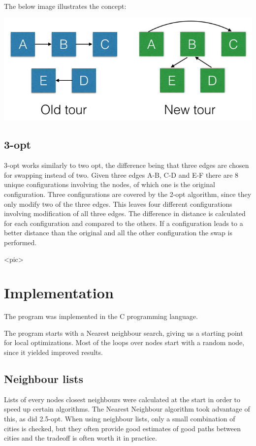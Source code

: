 \documentclass[paper=a4, fontsize=11pt,numbers=endperiod]{scrartcl} %
\numberwithin{equation}{section} %
\numberwithin{figure}{section} %
\numberwithin{table}{section} %
\begin{document}
The below image illustrates the concept:

\begin{center}
\includegraphics[scale=0.4]{25opt}
\end{center}

\subsection{3-opt}
3-opt works similarly to two opt, the difference being that three edges are chosen for swapping instead of two.
Given three edges A-B, C-D and E-F there are 8 unique configurations involving the nodes, of which one is the original configuration.
Three configurations are covered by the 2-opt algorithm, since they only modify two of the three edges.
This leaves four different configurations involving modification of all three edges.
The difference in distance is calculated for each configuration and compared to the others.
If a configuration leads to a better distance than the original and all the other configuration the swap is performed.

<pic>
    

\section{Implementation}
The program was implemented in the C programming language.

The program starts with a Nearest neighbour search, giving us a starting point for local optimizations.
Most of the loops over nodes start with a random node, since it yielded improved results.
\subsection{Neighbour lists}
Lists of every nodes closest neighbours were calculated at the start in order to speed up certain algorithms.
The Nearest Neighbour algorithm took advantage of this, as did 2.5-opt. When using neighbour lists, only a small combination of cities is checked, but they often provide good estimates of good paths between cities and the tradeoff is often worth it in practice.
\end{document}
